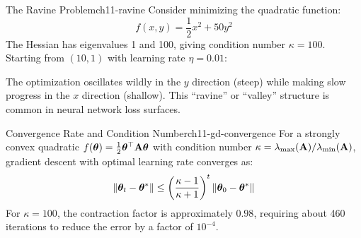 \documentclass[../../main.tex]{subfiles}
\begin{document}
\begin{example}{The Ravine Problem}{ch11-ravine}
Consider minimizing the quadratic function:
\[
    f(x, y) = \frac{1}{2}x^2 + 50y^2
\]
The Hessian has eigenvalues 1 and 100, giving condition number $\kappa = 100$. Starting from $(10, 1)$ with learning rate $\eta = 0.01$:

\begin{center}
\end{center}

The optimization oscillates wildly in the $y$ direction (steep) while making slow progress in the $x$ direction (shallow). This ``ravine'' or ``valley'' structure is common in neural network loss surfaces.
\end{example}

\begin{theorem}{Convergence Rate and Condition Number}{ch11-gd-convergence}
For a strongly convex quadratic $f(\boldsymbol{\theta}) = \frac{1}{2}\boldsymbol{\theta}^\top \mathbf{A} \boldsymbol{\theta}$ with condition number $\kappa = \lambda_{\max}(\mathbf{A})/\lambda_{\min}(\mathbf{A})$, gradient descent with optimal learning rate converges as:
\[
    \left\lVert \boldsymbol{\theta}_t - \boldsymbol{\theta}^* \right\rVert \leq \left(\frac{\kappa - 1}{\kappa + 1}\right)^t \left\lVert \boldsymbol{\theta}_0 - \boldsymbol{\theta}^* \right\rVert
\]
For $\kappa = 100$, the contraction factor is approximately $0.98$, requiring about 460 iterations to reduce the error by a factor of $10^{-4}$.
\end{theorem}
\end{document}
